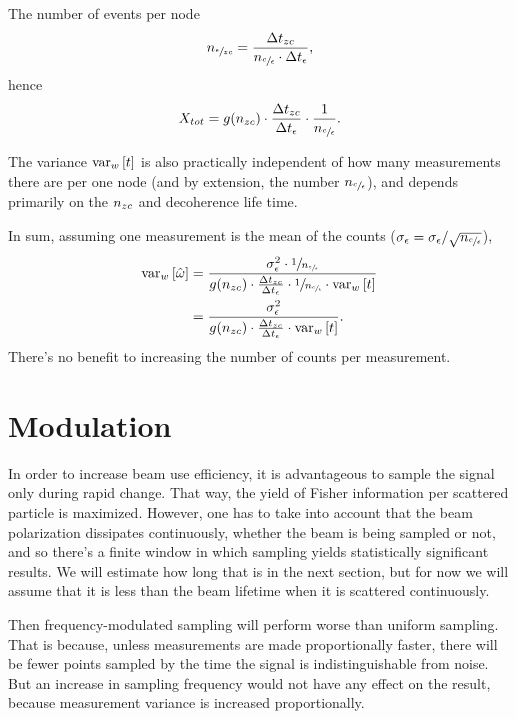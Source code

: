 \documentclass{article}
\begin{document}
The number of events per node 
\[
	n_{\sfrac{\epsilon}{zc}} = \frac{\Delta t_{zc}}{n_{\sfrac{c}{\epsilon}}\cdot \Delta t_{\epsilon}},
\]
hence
\[
	X_{tot} = g(n_{zc}) \cdot \frac{\Delta t_{zc}}{\Delta t_{\epsilon}}\cdot \frac{1}{n_{\sfrac{c}{\epsilon}}}.
\]

The variance $\var[w]{t}$ is also practically independent of how many measurements there are per one node (and by extension, the number $n_{\sfrac{c}{\epsilon}}$), and depends primarily on the $n_{zc}$ and decoherence life time.

In sum, assuming one measurement is the mean of the counts ($\SD{\meas} = \SD{\meas}/\sqrt{\Ncm}$), 
\begin{align*}
	\var[w]{\hat{\omega}} &= \frac{\SD{\meas}^2\cdot \sfrac{1}{\Ncm}}{g(\Nnd)\cdot \frac{\Delta t_{zc}}{\Delta t_{\meas}}\cdot \sfrac{1}{\Ncm} \cdot \var[w]{t}} \\
		&= \frac{\SD{\meas}^2}{g(\Nnd)\cdot \frac{\Delta t_{zc}}{\Delta t_{\meas}} \cdot \var[w]{t}}.
\end{align*}
There's no benefit to increasing the number of counts per measurement.

\section{Modulation}

In order to increase beam use efficiency, it is advantageous to sample the signal only during rapid change. That way, the yield of Fisher information per scattered particle is maximized. However, one has to take into account that the beam polarization dissipates continuously, whether the beam is being sampled or not, and so there's a finite window in which sampling yields statistically significant results. We will estimate how long that is in the next section, but for now we will assume that it is less than the beam lifetime when it is scattered continuously.

Then frequency-modulated sampling will perform worse than uniform sampling. That is because, unless measurements are made proportionally faster, there will be fewer points sampled by the time the signal is indistinguishable from noise. But an increase in sampling frequency would not have any effect on the result, because measurement variance is increased proportionally.
\end{document}
